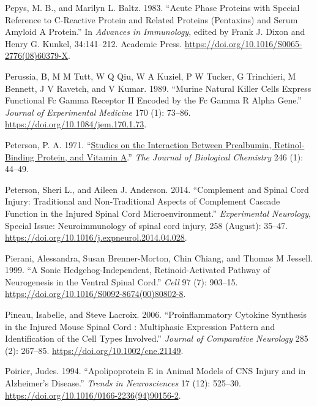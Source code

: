\documentclass[9pt,lineno]{elife}
\newlength{\cslhangindent}
\newlength{\cslentryspacingunit} %
\newenvironment{CSLReferences}[2] %
 {%
  \setlength{\parindent}{0pt}
  \ifodd #1
  \let\oldpar\par
  \def\par{\hangindent=\cslhangindent\oldpar}
  \fi
  \setlength{\parskip}{#2\cslentryspacingunit}
 }%
 {}
\begin{document}
\begin{landscape}
\begin{landscape}
\begin{landscape}
\begin{landscape}
\begin{CSLReferences}{1}{0}
\leavevmode{}%
Pepys, M. B., and Marilyn L. Baltz. 1983. {``Acute {Phase Proteins} with {Special Reference} to {C-Reactive Protein} and {Related Proteins} ({Pentaxins}) and {Serum Amyloid A Protein}.''} In \emph{Advances in {Immunology}}, edited by Frank J. Dixon and Henry G. Kunkel, 34:141--212. {Academic Press}. \url{https://doi.org/10.1016/S0065-2776(08)60379-X}.

\leavevmode{}%
Perussia, B, M M Tutt, W Q Qiu, W A Kuziel, P W Tucker, G Trinchieri, M Bennett, J V Ravetch, and V Kumar. 1989. {``Murine Natural Killer Cells Express Functional {Fc} Gamma Receptor {II} Encoded by the {Fc} Gamma {R} Alpha Gene.''} \emph{Journal of Experimental Medicine} 170 (1): 73--86. \url{https://doi.org/10.1084/jem.170.1.73}.

\leavevmode{}%
Peterson, P. A. 1971. {``\href{https://www.ncbi.nlm.nih.gov/pubmed/5541771}{Studies on the Interaction Between Prealbumin, Retinol-Binding Protein, and Vitamin {A}}.''} \emph{The Journal of Biological Chemistry} 246 (1): 44--49.

\leavevmode{}%
Peterson, Sheri L., and Aileen J. Anderson. 2014. {``Complement and Spinal Cord Injury: {Traditional} and Non-Traditional Aspects of Complement Cascade Function in the Injured Spinal Cord Microenvironment.''} \emph{Experimental Neurology}, Special {Issue}: {Neuroimmunology} of spinal cord injury, 258 (August): 35--47. \url{https://doi.org/10.1016/j.expneurol.2014.04.028}.

\leavevmode{}%
Pierani, Alessandra, Susan Brenner-Morton, Chin Chiang, and Thomas M Jessell. 1999. {``A {Sonic Hedgehog-Independent}, {Retinoid-Activated Pathway} of {Neurogenesis} in the {Ventral Spinal Cord}.''} \emph{Cell} 97 (7): 903--15. \url{https://doi.org/10.1016/S0092-8674(00)80802-8}.

\leavevmode{}%
Pineau, Isabelle, and Steve Lacroix. 2006. {``Proinflammatory {Cytokine Synthesis} in the {Injured Mouse Spinal Cord} : {Multiphasic Expression Pattern} and {Identification} of the {Cell Types Involved}.''} \emph{Journal of Comparative Neurology} 285 (2): 267--85. \url{https://doi.org/10.1002/cne.21149}.

\leavevmode{}%
Poirier, Judes. 1994. {``Apolipoprotein {E} in Animal Models of {CNS} Injury and in Alzheimer's Disease.''} \emph{Trends in Neurosciences} 17 (12): 525--30. \url{https://doi.org/10.1016/0166-2236(94)90156-2}.


\end{CSLReferences}
\end{landscape}
\end{landscape}
\end{landscape}
\end{landscape}
\end{document}
